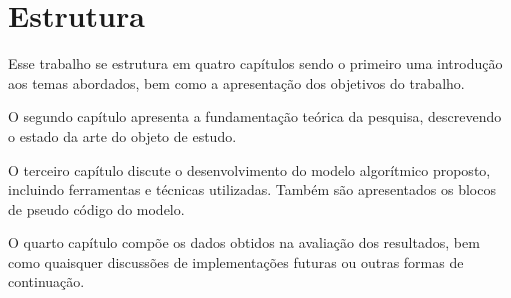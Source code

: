 \documentclass[notes.tex]{subfiles}
\begin{document}
\section{Estrutura}

Esse trabalho se estrutura em quatro capítulos sendo o primeiro uma introdução aos temas abordados, bem como a apresentação dos objetivos do trabalho.

O segundo capítulo apresenta a fundamentação teórica da pesquisa, descrevendo o estado da arte do objeto de estudo.

O terceiro capítulo discute o desenvolvimento do modelo algorítmico proposto, incluindo ferramentas e técnicas utilizadas.
Também são apresentados os blocos de pseudo código do modelo.

O quarto capítulo compõe os dados obtidos na avaliação dos resultados, bem como quaisquer discussões de implementações futuras ou outras formas de continuação.
\end{document}
